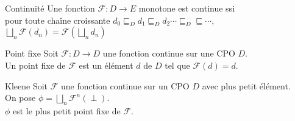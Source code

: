 \documentclass[10pt,a4paper]{article}
\begin{document}
\begin{definition}{Continuité} Une fonction $\mathcal{F} : D \to E$ monotone est continue ssi\\ pour toute chaîne croissante $d_0 \sqsubseteq_D d_1 \sqsubseteq_D d_2 \cdots  \sqsubseteq_D \sqsubseteq \cdots ,$\\
\indent$\displaystyle\bigsqcup_n \mathcal{F} (d_n) = \mathcal{F}( \bigsqcup_n d_n)$\\
\end{definition}

\begin{definition}{Point fixe}
 Soit $\mathcal{F} : D \to D$ une fonction continue sur une CPO $D$.\\
 Un point fixe de $\mathcal{F}$ est un élément $d$ de $D$ tel que $\mathcal{F}(d) = d$.\\
\end{definition}

\begin{thm}{Kleene}
 Soit $\mathcal{F}$ une fonction continue sur un CPO $D$ avec plus petit élément. \\
On pose  $\displaystyle\phi = \bigsqcup_n \mathcal{F}^n(\perp).$\\
$\phi$ est le plus petit point fixe de $\mathcal{F}$.\\
\end{thm}
\end{document}
